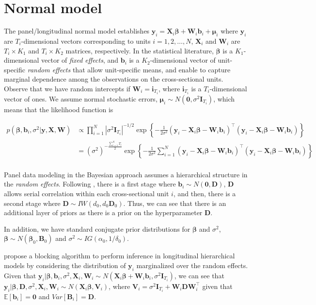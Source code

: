 \section{Normal model}\label{sec91}

The panel/longitudinal normal model establishes $\bm{y}_i=\bm{X}_i\bm{\beta}+\bm{W}_i\bm{b}_i+\bm{\mu}_i$ where $\bm{y}_i$ are $T_i$-dimensional vectors corresponding to units $i=1,2,\dots,N$, $\bm{X}_i$ and $\bm{W}_i$ are $T_i\times K_1$ and $T_i\times K_2$ matrices, respectively. In the statistical literature, $\bm{\beta}$ is a $K_1$-dimensional vector of \textit{fixed effects}, and $\bm{b}_i$ is a $K_2$-dimensional vector of unit-specific \textit{random effects} that allow unit-specific means, and enable to capture marginal dependence among the observations on the cross-sectional units. Observe that we have random intercepts if $\bm{W}_i=\bm{i}_{T_i}$, where $\bm{i}_{T_i}$ is a $T_i$-dimensional vector of ones. We assume normal stochastic errors, $\bm{\mu}_i\sim{N}(\bm{0},\sigma^2\bm{I}_{T_i})$, which means that the likelihood function is

{\footnotesize
\begin{align*}
	p(\bm{\beta},\bm{b}_i,\sigma^2|\bm{y}, \bm{X},\bm{W}) & \propto \prod_{i=1}^N |\sigma^2\bm{I}_{T_i}|^{-1/2}\exp\left\{-\frac{1}{2\sigma^2}(\bm{y}_i-\bm{X}_i\bm{\beta}-\bm{W}_i\bm{b}_i)^{\top}(\bm{y}_i-\bm{X}_i\bm{\beta}-\bm{W}_i\bm{b}_i)\right\}\\
	& = (\sigma^2)^{-\frac{\sum_{i=1}^N T_i}{2}}\exp\left\{-\frac{1}{2\sigma^2}\sum_{i=1}^N(\bm{y}_i-\bm{X}_i\bm{\beta}-\bm{W}_i\bm{b}_i)^{\top}(\bm{y}_i-\bm{X}_i\bm{\beta}-\bm{W}_i\bm{b}_i)\right\}\\
\end{align*} 
}

Panel data modeling in the Bayesian approach assumes a hierarchical structure in the \textit{random effects}. Following \cite{Chib1999}, there is a first stage where $\bm{b}_i\sim{N}(\bm{0},\bm{D})$, $\bm{D}$ allows serial correlation within each cross-sectional unit $i$, and then, there is a second stage where $\bm{D}\sim{I}{W}(d_0,d_0\bm{D}_0)$. Thus, we can see that there is an additional layer of priors as there is a prior on the hyperparameter $\bm{D}$. 

In addition, we have standard conjugate prior distributions for $\bm{\beta}$ and $\sigma^2$, $\bm{\beta} \sim {N}(\bm{\beta}_0,\bm{B}_0)$ and 
$\sigma^2 \sim {I}{G}(\alpha_0, 1/\delta_0)$. 

\cite{Chib1999} propose a blocking algorithm to perform inference in longitudinal hierarchical models by considering the distribution of $\bm{y}_i$ marginalized over the random effects. Given that $\bm{y}_i| \bm{\beta},\bm{b}_i,\sigma^2,\bm{X}_i,\bm{W}_i\sim N(\bm{X}_i\bm{\beta}+\bm{W}_i\bm{b}_i,\sigma^2\bm{I}_{T_i})$, we can see that    $\bm{y}_i|\bm{\beta},\bm{D},\sigma^2,\bm{X}_i,\bm{W}_i\sim{N}(\bm{X}_i\bm{\beta},\bm{V}_i)$, where $\bm{V}_i=\sigma^2\bm{I}_{T_i}+\bm{W}_i\bm{D}\bm{W}_i^{\top}$ given that $\mathbb{E}[\bm{b}_i]=\bm{0}$ and $Var[\bm{B}_i]=\bm{D}$.

